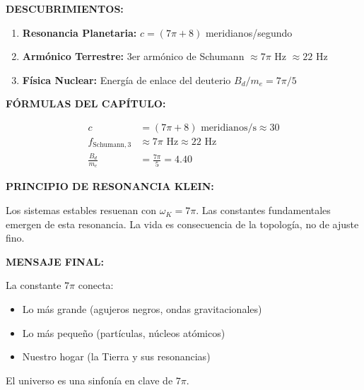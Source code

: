 \begin{tcolorbox}[colback=kleingray, colframe=kleinblue, title=\textbf{Resumen del Capítulo 12}]

\textbf{DESCUBRIMIENTOS:}

\begin{enumerate}
    \item \textbf{Resonancia Planetaria:}
    $c = (7\pi + 8)$ meridianos/segundo

    \item \textbf{Armónico Terrestre:}
    3er armónico de Schumann $\approx 7\pi$ Hz $\approx 22$ Hz

    \item \textbf{Física Nuclear:}
    Energía de enlace del deuterio $B_d/m_e = 7\pi/5$
\end{enumerate}

\vspace{0.3cm}
\textbf{FÓRMULAS DEL CAPÍTULO:}

\begin{align}
c &= (7\pi + 8) \text{ meridianos/s} \approx 30\\
f_{\text{Schumann},3} &\approx 7\pi \text{ Hz} \approx 22 \text{ Hz}\\
\frac{B_d}{m_e} &= \frac{7\pi}{5} = 4.40
\end{align}

\vspace{0.3cm}
\textbf{PRINCIPIO DE RESONANCIA KLEIN:}

Los sistemas estables resuenan con $\omega_K = 7\pi$.
Las constantes fundamentales emergen de esta resonancia.
La vida es consecuencia de la topología, no de ajuste fino.

\vspace{0.3cm}
\textbf{MENSAJE FINAL:}

La constante $7\pi$ conecta:
\begin{itemize}
    \item Lo más grande (agujeros negros, ondas gravitacionales)
    \item Lo más pequeño (partículas, núcleos atómicos)
    \item Nuestro hogar (la Tierra y sus resonancias)
\end{itemize}

El universo es una sinfonía en clave de $7\pi$.

\end{tcolorbox}


